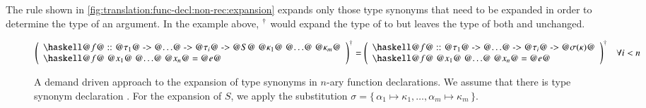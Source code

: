 The rule shown in \autoref{fig:translation:func-decl:non-rec:expansion} expands only those type synonyms that need to be expanded in order to determine the type of an argument.
In the example above, ${}^{\dagger}$ would expand the type of  to  but leaves the type of both  and  unchanged.

\begin{figure}[H]
  \begin{align*}
    \toCoq{\left(
      \begin{array}{l}
        \haskellM{@$f$@ :: @$\tau_1$@ -> @$\ldots$@ -> @$\tau_i$@ -> @$S$@ @$\kappa_1$@ @$\ldots$@ @$\kappa_m$@} \\
        \haskellM{@$f$@ @$x_1$@ @$\ldots$@ @$x_n$@ = @$e$@}
      \end{array}
    \right)}
    = \toCoq{\left(
      \begin{array}{l}
        \haskellM{@$f$@ :: @$\tau_1$@ -> @$\ldots$@ -> @$\tau_i$@ -> @$\sigma(\kappa)$@} \\
        \haskellM{@$f$@ @$x_1$@ @$\ldots$@ @$x_n$@ = @$e$@}
      \end{array}
    \right)}
    &&\forall i < n
  \end{align*}
  \caption{
    A demand driven approach to the expansion of type synonyms in $n$-ary function declarations.
    We assume that there is type synonym declaration .
    For the expansion of $S$, we apply the substitution $\sigma = \{\, \alpha_1 \mapsto \kappa_1, \ldots, \alpha_m \mapsto \kappa_m \,\}$.
  }
  \label{fig:translation:func-decl:non-rec:expansion}
\end{figure}

